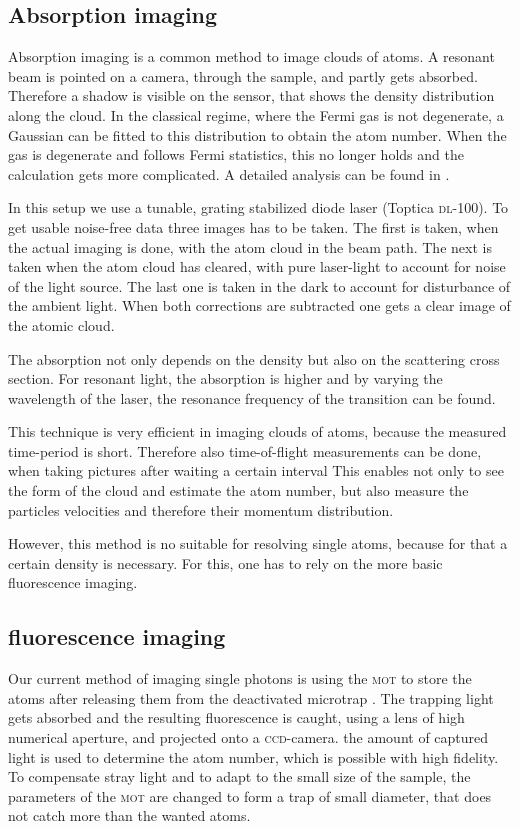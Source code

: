 \subsection{Absorption imaging}

Absorption imaging is a common method to image clouds of atoms\cite{ketterle}. A resonant beam is pointed on a camera, through the sample, and partly gets absorbed. Therefore a shadow is visible on the sensor, that shows the density distribution along the cloud. In the classical regime, where the Fermi gas is not degenerate, a Gaussian can be fitted to this distribution to obtain the atom number. When the gas is degenerate and follows Fermi statistics, this no longer holds and the calculation gets more complicated. A detailed analysis can be found in \cite{ketterle2}.

In this setup we use a tunable, grating stabilized diode laser (Toptica \textsc{dl}-100). To get usable noise-free data three images has to be taken. The first is taken, when the actual imaging is done, with the atom cloud in the beam path. The next is taken when the atom cloud has cleared, with pure laser-light to account for noise of the light source. The last one is taken in the dark to account for disturbance of the ambient light. When both corrections are subtracted one gets a clear image of the atomic cloud.

The absorption not only depends on the density but also on the scattering cross section. For resonant light, the absorption is higher and by varying the wavelength of the laser, the resonance frequency of the transition can be found.

This technique is very efficient in imaging clouds of atoms, because the measured time-period is short. Therefore also time-of-flight measurements can be done, when taking pictures after waiting a certain interval This enables not only to see the form of the cloud and estimate the atom number, but also measure the particles velocities and therefore their momentum distribution.

However, this method is no suitable for resolving single atoms, because for that a certain density is necessary. For this, one has to rely on the more basic fluorescence imaging.

\subsection{fluorescence imaging}

Our current method of imaging single photons is using the \textsc{mot} to store the atoms after releasing them from the deactivated microtrap \cite{timo}. The trapping light gets absorbed and the resulting fluorescence is caught, using a lens of high numerical aperture, and projected onto a \textsc{ccd}-camera. the amount of captured light is used to determine the atom number, which is possible with high fidelity. To compensate stray light and to adapt to the small size of the sample, the parameters of the \textsc{mot} are changed to form a trap of small diameter, that does not catch more than the wanted atoms.

